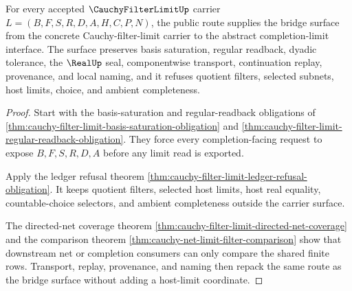 \begin{theorem}
\label{thm:cauchy-filter-limit-bridge-surface}
For every accepted $\CauchyFilterLimitUp$ carrier $L=(B,F,S,R,D,A,H,C,P,N)$, the public route supplies the bridge surface from the concrete Cauchy-filter-limit carrier to the abstract completion-limit interface. The surface preserves basis saturation, regular readback, dyadic tolerance, the $\RealUp$ seal, componentwise transport, continuation replay, provenance, and local naming, and it refuses quotient filters, selected subnets, host limits, choice, and ambient completeness.
\end{theorem}
\begin{proof}
Start with the basis-saturation and regular-readback obligations of \autoref{thm:cauchy-filter-limit-basis-saturation-obligation} and \autoref{thm:cauchy-filter-limit-regular-readback-obligation}. They force every completion-facing request to expose $B,F,S,R,D,A$ before any limit read is exported.

Apply the ledger refusal theorem \autoref{thm:cauchy-filter-limit-ledger-refusal-obligation}. It keeps quotient filters, selected host limits, host real equality, countable-choice selectors, and ambient completeness outside the carrier surface.

The directed-net coverage theorem \autoref{thm:cauchy-filter-limit-directed-net-coverage} and the comparison theorem \autoref{thm:cauchy-net-limit-filter-comparison} show that downstream net or completion consumers can only compare the shared finite rows. Transport, replay, provenance, and naming then repack the same route as the bridge surface without adding a host-limit coordinate.
\end{proof}

